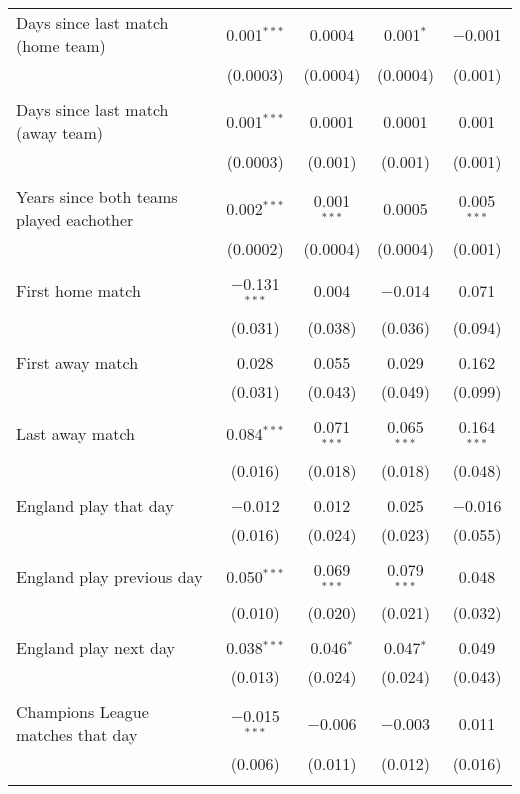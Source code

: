\begin{tabular}{@{\extracolsep{5pt}}lcccc}
 Days since last match (home team) & 0.001$^{***}$ & 0.0004 & 0.001$^{*}$ & $-$0.001 \\ 
  & (0.0003) & (0.0004) & (0.0004) & (0.001) \\ 
  & & & & \\ 
 Days since last match (away team) & 0.001$^{***}$ & 0.0001 & 0.0001 & 0.001 \\ 
  & (0.0003) & (0.001) & (0.001) & (0.001) \\ 
  & & & & \\ 
 Years since both teams played eachother & 0.002$^{***}$ & 0.001$^{***}$ & 0.0005 & 0.005$^{***}$ \\ 
  & (0.0002) & (0.0004) & (0.0004) & (0.001) \\ 
  & & & & \\ 
 First home match & $-$0.131$^{***}$ & 0.004 & $-$0.014 & 0.071 \\ 
  & (0.031) & (0.038) & (0.036) & (0.094) \\ 
  & & & & \\ 
 First away match & 0.028 & 0.055 & 0.029 & 0.162 \\ 
  & (0.031) & (0.043) & (0.049) & (0.099) \\ 
  & & & & \\ 
 Last away match & 0.084$^{***}$ & 0.071$^{***}$ & 0.065$^{***}$ & 0.164$^{***}$ \\ 
  & (0.016) & (0.018) & (0.018) & (0.048) \\ 
  & & & & \\ 
 England play that day & $-$0.012 & 0.012 & 0.025 & $-$0.016 \\ 
  & (0.016) & (0.024) & (0.023) & (0.055) \\ 
  & & & & \\ 
 England play previous day & 0.050$^{***}$ & 0.069$^{***}$ & 0.079$^{***}$ & 0.048 \\ 
  & (0.010) & (0.020) & (0.021) & (0.032) \\ 
  & & & & \\ 
 England play next day & 0.038$^{***}$ & 0.046$^{*}$ & 0.047$^{*}$ & 0.049 \\ 
  & (0.013) & (0.024) & (0.024) & (0.043) \\ 
  & & & & \\ 
 Champions League matches that day & $-$0.015$^{***}$ & $-$0.006 & $-$0.003 & 0.011 \\ 
  & (0.006) & (0.011) & (0.012) & (0.016) \\ 
  & & & & \\ 

\end{tabular}
